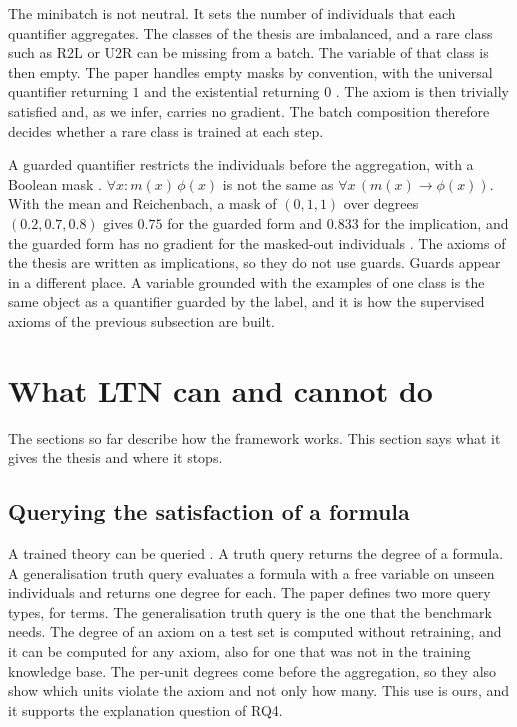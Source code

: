 The minibatch is not neutral. It sets the number of individuals that each
quantifier aggregates. The classes of the thesis are imbalanced, and a rare
class such as R2L or U2R can be missing from a batch. The variable of that
class is then empty. The paper handles empty masks by convention, with the
universal quantifier returning $1$ and the existential returning $0$
\citep{badreddine2022ltn}. The axiom is then trivially satisfied and, as we
infer, carries no gradient. The batch composition therefore decides whether a
rare class is trained at each step.

A guarded quantifier restricts the individuals before the aggregation, with a
Boolean mask \citep{badreddine2022ltn}. $\forall x:m(x)\,\phi(x)$ is not the
same as $\forall x\,(m(x)\rightarrow\phi(x))$. With the mean and Reichenbach,
a mask of $(0,1,1)$ over degrees $(0.2,0.7,0.8)$ gives $0.75$ for the guarded
form and $0.833$ for the implication, and the guarded form has no gradient for
the masked-out individuals \citep{badreddine2022ltn}. The axioms of the
thesis are written as implications, so they do not use guards. Guards appear
in a different place. A variable grounded with the examples of one class is
the same object as a quantifier guarded by the label, and it is how the
supervised axioms of the previous subsection are built.

\section{What LTN can and cannot do}
\label{sec:ltn-capabilities}

The sections so far describe how the framework works. This section says what it
gives the thesis and where it stops.

\subsection{Querying the satisfaction of a formula}
\label{sec:querying}

A trained theory can be queried \citep{badreddine2022ltn}. A truth query
returns the degree of a formula. A generalisation truth query evaluates a
formula with a free variable on unseen individuals and returns one degree for
each. The paper defines two more query types, for terms. The generalisation truth
query is the one that the benchmark needs. The degree of an axiom on a test set is computed
without retraining, and it can be computed for any axiom, also for one that was
not in the training knowledge base. The per-unit degrees come before the
aggregation, so they also show which units violate the axiom and not only how
many. This use is ours, and it supports the explanation question of RQ4.

